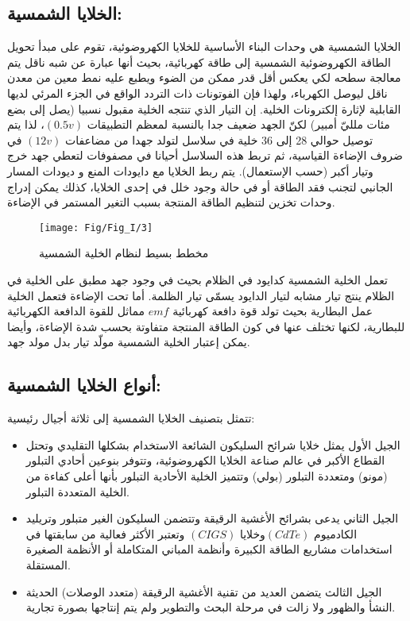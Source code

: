 \subsection{الخلايا الشمسية:}
الخلايا الشمسية هي وحدات البناء الأساسية للخلايا الكهروضوئية، تقوم على مبدأ تحويل الطاقة الكهروضوئية الشمسية إلى طاقة كهربائية، بحيث أنها عبارة عن شبه ناقل يتم معالجة سطحه لكي يعكس أقل قدر ممكن من الضوء ويطبع عليه نمط معين من معدن ناقل ليوصل الكهرباء، ولهذا فإن الفوتونات ذات التردد الواقع في الجزء المرئي لديها القابلية لإثارة إلكترونات الخلية. إن التيار الذي تنتجه الخلية مقبول نسبيا (يصل إلى بضع مئات ملليّ أمبير) لكنّ الجهد ضعيف جدا بالنسبة لمعظم التطبيقات $ (0.5v) $، لذا يتم توصيل حوالي 28 إلى 36 خلية في سلاسل لتولد جهدا من مضاعفات $ (12v) $ في ضروف الإضاءة القياسية، ثم تربط هذه السلاسل أحيانا في مصفوفات لتعطي جهد خرج وتيار أكبر (حسب الإستعمال). يتم ربط الخلايا مع دايودات المنع و ديودات المسار الجانبي لتجنب فقد الطاقة أو في حالة وجود خلل في إحدى الخلايا، كذلك يمكن إدراج وحدات تخزين لتنظيم الطاقة المنتجة بسبب التغير المستمر في الإضاءة.
\begin{figure}[h!]
	\centering
	\texttt{[image: Fig/Fig\_I/3]}
	\caption{مخطط بسيط لنظام الخلية الشمسية}
	\label{fig:3}
\end{figure}
\FloatBarrier
تعمل الخلية الشمسية كدايود في الظلام بحيث في وجود جهد مطبق على الخلية في الظلام ينتج تيار مشابه لتيار الدايود يسمّى تيار الظلمة. أما تحت الإضاءة فتعمل الخلية عمل البطارية بحيث تولد قوة دافعة كهربائية $ emf $ مماثل للقوة الدافعة الكهربائية للبطارية، لكنها تختلف عنها في كون الطاقة المنتجة متفاوتة بحسب شدة الإضاءة، وأيضا يمكن إعتبار الخلية الشمسية مولّد تيار بدل مولد جهد.
\subsection{ أنواع الخلايا الشمسية: }
تتمثل بتصنيف الخلايا الشمسية إلى ثلاثة أجيال رئيسية:
\begin{itemize}
	\item الجيل الأول
	يمثل خلايا شرائح السليكون الشائعة الاستخدام بشكلها التقليدي وتحتل القطاع الأكبر في عالم صناعة الخلايا الكهروضوئية، وتتوفر بنوعين أحادي التبلور (مونو) ومتعددة التبلور (بولي) وتتميز الخلية الأحادية التبلور بأنها أعلى كفاءة من الخلية المتعددة التبلور.
	\item الجيل الثاني 
	يدعى بشرائح الأغشية الرقيقة وتتضمن السليكون الغير متبلور وتريليد الكادميوم $ (CdTe)  $وخلايا $ (CIGS) $ وتعتبر الأكثر فعالية من سابقتها في استخدامات مشاريع الطاقة الكبيرة وأنظمة المباني المتكاملة أو الأنظمة الصغيرة المستقلة.
	\item الجيل الثالث 
	يتضمن العديد من تقنية الأغشية الرقيقة (متعدد الوصلات) الحديثة النشأ والظهور ولا زالت في مرحلة البحث والتطوير ولم يتم إنتاجها بصورة تجارية.
\end{itemize}


